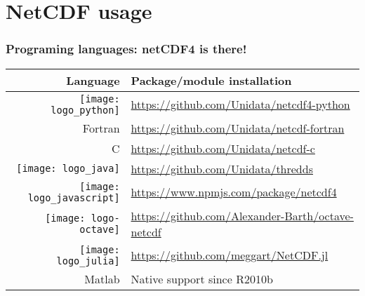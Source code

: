 \section{NetCDF usage}

\begin{frame}
\frametitle{Programing languages: netCDF4 is there!}
\begin{table}
\begin{tabular}{rl}
\toprule
Language 	& 		Package/module installation \\
\midrule
\texttt{[image: logo\_python]}		& 		\url{https://github.com/Unidata/netcdf4-python}\\
Fortran											& 		\url{https://github.com/Unidata/netcdf-fortran}\\
C												& 		\url{https://github.com/Unidata/netcdf-c}\\
\texttt{[image: logo\_java]}			& 		\url{https://github.com/Unidata/thredds}\\
\texttt{[image: logo\_javascript]}	& 		\url{https://www.npmjs.com/package/netcdf4}\\
\texttt{[image: logo-octave]}		&		\url{https://github.com/Alexander-Barth/octave-netcdf}\\
\texttt{[image: logo\_julia]}		&  		\url{https://github.com/meggart/NetCDF.jl}\\
Matlab											&		Native support since R2010b\\
\bottomrule
\end{tabular}
\end{table}


\end{frame}


